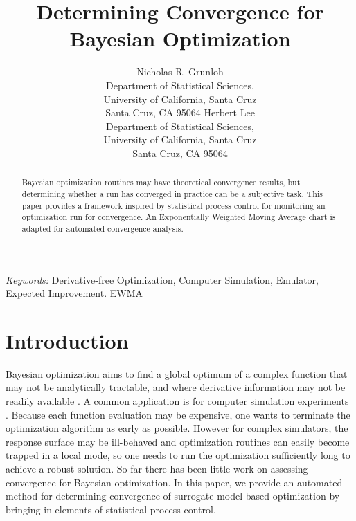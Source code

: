 \documentclass{article}
\title{{\LARGE\bf Determining Convergence for Bayesian Optimization}}
\author{
Nicholas R. Grunloh\\
Department of Statistical Sciences,\\ University of California, Santa Cruz\\
Santa Cruz, CA 95064
\And
Herbert Lee\\
Department of Statistical Sciences,\\ University of California, Santa Cruz\\
Santa Cruz, CA 95064
}
\begin{document}
\def\spacingset#1{\renewcommand{\baselinestretch}%
{#1}\small\normalsize} \spacingset{1}

%
\maketitle

%
\begin{abstract}
\noindent 
Bayesian optimization routines may have theoretical convergence
results, but determining whether a run has converged in practice can
be a subjective task. This paper provides a framework inspired by
statistical process control for monitoring an optimization run for convergence.
An Exponentially Weighted Moving Average chart is adapted for
automated convergence analysis.
\end{abstract}


\noindent
{\it Keywords:} Derivative-free Optimization, Computer Simulation, Emulator, Expected Improvement. EWMA


%
%
\section{Introduction}
%
%


Bayesian optimization aims to find a global optimum of a complex
function that may not be analytically tractable, and where derivative
information may not be readily available
\citep{mockus:1989,brochu:2010}. A common application is for computer
simulation experiments \cite{gramacy:2020}. Because each function
evaluation may be
expensive, one wants to terminate the optimization algorithm as early as possible. 
However for complex simulators, the response surface may be ill-behaved and optimization 
routines can easily become trapped in a local mode, so one needs to run the 
optimization sufficiently long to achieve a robust solution. So far
there has been little work on assessing convergence for Bayesian
optimization. In this paper, we provide an automated method for determining 
convergence of surrogate model-based optimization by bringing in 
elements of statistical process control.
\end{document}
